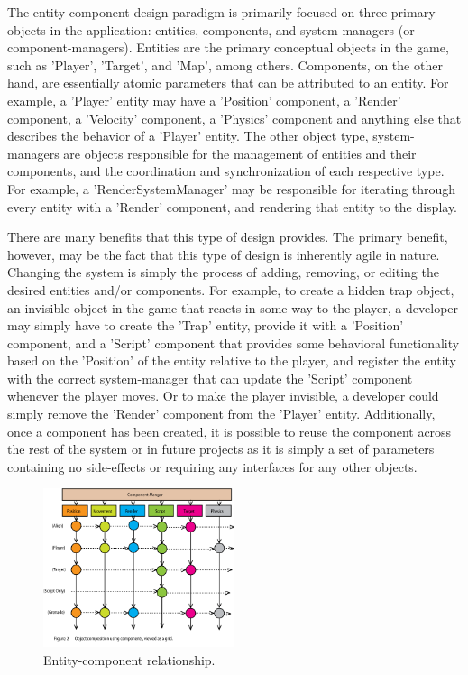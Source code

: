 The entity-component design paradigm is primarily focused on three primary objects in the application: entities, components, and system-managers (or component-managers). Entities are the primary conceptual objects in the game, such as 'Player', 'Target', and 'Map', among others. Components, on the other hand, are essentially atomic parameters that can be attributed to an entity. For example, a 'Player' entity may have a 'Position' component, a 'Render' component, a 'Velocity' component, a 'Physics' component and anything else that describes the behavior of a 'Player' entity. The other object type, system-managers are objects responsible for the management of entities and their components, and the coordination and synchronization of each respective type. For example, a 'RenderSystemManager' may be responsible for iterating through every entity with a 'Render' component, and rendering that entity to the display.

There are many benefits that this type of design provides. The primary benefit, however, may be the fact that this type of design is inherently agile in nature. Changing the system is simply the process of adding, removing, or editing the desired entities and/or components. For example, to create a hidden trap object, an invisible object in the game that reacts in some way to the player, a developer may simply have to create the 'Trap' entity, provide it with a 'Position' component, and a 'Script' component that provides some behavioral functionality based on the 'Position' of the entity relative to the player, and register the entity with the correct system-manager that can update the 'Script' component whenever the player moves. Or to make the player invisible, a developer could simply remove the 'Render' component from the 'Player' entity. Additionally, once a component has been created, it is possible to reuse the component across the rest of the system or in future projects as it is simply a set of parameters containing no side-effects or requiring any interfaces for any other objects.

\begin{figure}[h!]
  \centering \includegraphics[width=0.5\textwidth]{Images/aggregation.png}
  \caption{Entity-component relationship.\cite{evolve_your_hierarchy}}
\end{figure}

